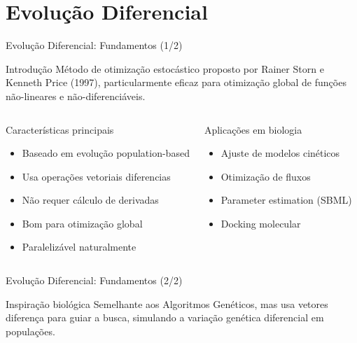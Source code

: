 \section{Evolução Diferencial}

\begin{frame}{Evolução Diferencial: Fundamentos (1/2)}
\begin{block}{Introdução}
Método de otimização estocástico proposto por Rainer Storn e Kenneth Price (1997), particularmente eficaz para otimização global de funções não-lineares e não-diferenciáveis.
\end{block}

\vspace{0.3cm}

\begin{columns}
\begin{block}{Características principais}
\begin{itemize}
    \item Baseado em evolução population-based
    \item Usa operações vetoriais diferencias
    \item Não requer cálculo de derivadas
    \item Bom para otimização global
    \item Paralelizável naturalmente
\end{itemize}
\end{block}

\begin{block}{Aplicações em biologia}
\begin{itemize}
    \item Ajuste de modelos cinéticos
    \item Otimização de fluxos
    \item Parameter estimation (SBML)
    \item Docking molecular
\end{itemize}
\end{block}
\end{columns}
\end{frame}

\begin{frame}{Evolução Diferencial: Fundamentos (2/2)}
\begin{block}{Inspiração biológica}
Semelhante aos Algoritmos Genéticos, mas usa vetores diferença para guiar a busca, simulando a variação genética diferencial em populações.
\end{block}
\end{frame}

